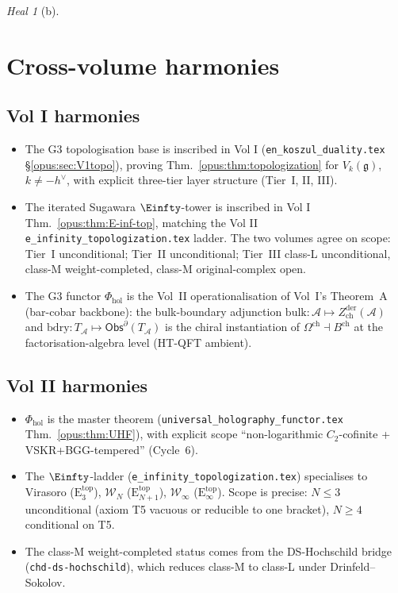 \documentclass{article}
\theoremstyle{definition}
\theoremstyle{remark}
\newtheorem{heal}[theorem]{Heal}
\newcommand{\Phihol}{\Phi_{\mathrm{hol}}}
\newcommand{\Obs}{\mathsf{Obs}}
\newcommand{\Zder}{Z^{\mathrm{der}}_{\mathrm{ch}}}
\newcommand{\Etop}[1]{\mathrm{E}_{#1}^{\mathrm{top}}}
\newcommand{\fg}{\mathfrak{g}}
\newcommand{\cW}{\mathcal{W}}
\newcommand{\cA}{\mathcal{A}}
\begin{document}
\begin{heal}[b]
\section{Cross-volume harmonies}
\label{sec:opus-harmonies}

\subsection{Vol I harmonies}
\begin{itemize}
\item The G3 topologisation base is inscribed in Vol I
(\texttt{en\_koszul\_duality.tex} \S\ref*{opus:sec:V1topo}),
proving
Thm.~\ref*{opus:thm:topologization} for $V_k(\fg)$,
$k \neq -h^\vee$, with explicit three-tier layer structure
(Tier~I, II, III).
\item The iterated Sugawara
$\Einfty$-tower is inscribed in Vol I
Thm.~\ref*{opus:thm:E-inf-top}, matching the Vol II
\texttt{e\_infinity\_topologization.tex} ladder. The two
volumes agree on scope: Tier~I unconditional; Tier~II
unconditional; Tier~III class-L unconditional,
class-M weight-completed, class-M original-complex open.
\item The G3 functor $\Phihol$ is the Vol~II operationalisation
of Vol~I's Theorem~A (bar-cobar backbone): the
bulk-boundary adjunction $\mathrm{bulk}: \cA \mapsto
\Zder(\cA)$ and $\mathrm{bdry}: T_\cA \mapsto
\Obs^\partial(T_\cA)$ is the chiral instantiation of
$\Omega^{\mathrm{ch}} \dashv B^{\mathrm{ch}}$ at the
factorisation-algebra level (HT-QFT ambient).
\end{itemize}

\subsection{Vol II harmonies}
\begin{itemize}
\item $\Phihol$ is the master theorem
(\texttt{universal\_holography\_functor.tex}
Thm.~\ref*{opus:thm:UHF}), with explicit scope
``non-logarithmic $C_2$-cofinite + VSKR+BGG-tempered''
(Cycle~6).
\item The $\Einfty$-ladder
(\texttt{e\_infinity\_topologization.tex}) specialises to
Virasoro ($\Etop{3}$), $\cW_N$ ($\Etop{N+1}$),
$\cW_\infty$ ($\Etop{\infty}$). Scope is precise: $N \le 3$
unconditional (axiom T5 vacuous or reducible to one
bracket), $N \ge 4$ conditional on T5.
\item The class-M weight-completed status comes from the
DS-Hochschild bridge
(\texttt{chd-ds-hochschild}), which reduces class-M to
class-L under Drinfeld--Sokolov.
\end{itemize}


\end{heal}
\end{document}
